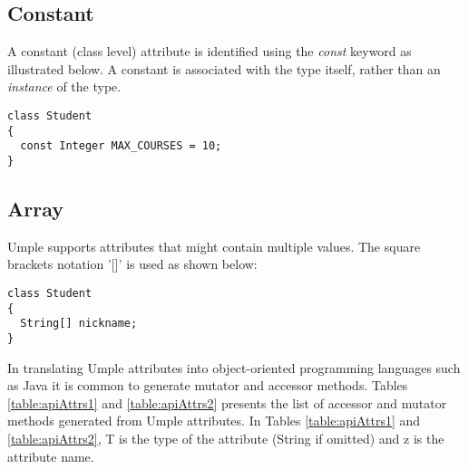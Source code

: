 \subsection{Constant}
A constant (class level) attribute is identified using the \emph{const} keyword as illustrated below. A constant is associated with the type itself, rather than an \emph{instance} of the type.
\vspace{\baselineskip}
\begin{lstlisting}[style=umplePlain]
class Student 
{
  const Integer MAX_COURSES = 10;
}
\end{lstlisting}
\subsection{Array}
Umple supports attributes that might contain multiple values. The square brackets notation '[]' is used as shown below:
\vspace{\baselineskip}
\begin{lstlisting}[style=umplePlain]
class Student 
{
  String[] nickname;
}
\end{lstlisting}

In translating Umple attributes into object-oriented programming languages such as Java it is common to generate mutator and accessor methods. Tables \ref{table:apiAttrs1} and \ref{table:apiAttrs2} presents the list of accessor and mutator methods generated from Umple attributes. In Tables \ref{table:apiAttrs1} and \ref{table:apiAttrs2}, T is the type of the attribute (String if omitted) and z is the attribute name.	

